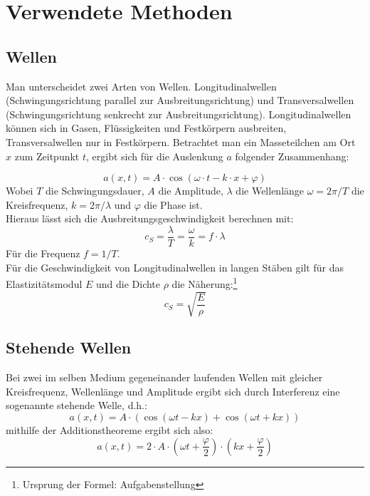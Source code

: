 \section{Verwendete Methoden}
\subsection{Wellen}
Man unterscheidet zwei Arten von Wellen. Longitudinalwellen (Schwingungsrichtung parallel zur Ausbreitungsrichtung) und Transversalwellen (Schwingungsrichtung senkrecht zur Ausbreitungsrichtung). Longitudinalwellen können sich in Gasen, Flüssigkeiten und Festkörpern ausbreiten, Transversalwellen nur in Festkörpern. Betrachtet man ein Masseteilchen am Ort $x$ zum Zeitpunkt $t$, ergibt sich für die Auslenkung $a$ folgender Zusammenhang:

\begin{equation}
a(x, t) = A \cdot \cos (\omega \cdot t - k \cdot x + \varphi)
\label{eq.wave}
\end{equation}
Wobei $T$ die Schwingungsdauer, $A$ die Amplitude, $\lambda$ die Wellenlänge $\omega = 2\pi /T$ die Kreisfrequenz, $k = 2\pi /\lambda$ und $\varphi$ die Phase ist.\\
Hieraus lässt sich die Ausbreitungsgeschwindigkeit berechnen mit:
\begin{equation}
c_S = \frac{\lambda}{T} = \frac{\omega}{k} = f \cdot \lambda
\label{eq:speed}
\end{equation}
Für die Frequenz $f = 1/T$.\\
Für die Geschwindigkeit von Longitudinalwellen in langen Stäben gilt für das Elastizitätsmodul $E$ und die Dichte $\rho$ die Näherung:\footnote{Ursprung der Formel: Aufgabenstellung}
\begin{equation}
c_S = \sqrt{\frac{E}{\rho}}
\label{eq:elast}
\end{equation}
\subsection{Stehende Wellen}
Bei zwei im selben Medium gegeneinander laufenden Wellen mit gleicher Kreisfrequenz, Wellenlänge und Amplitude ergibt sich durch Interferenz eine sogenannte stehende Welle, d.h.:
\begin{equation*}
a(x, t) = A \cdot (\cos (\omega t - kx) + \cos (\omega t + kx))
\end{equation*}
mithilfe der Additionstheoreme ergibt sich also:
\begin{equation}
a(x, t) = 2 \cdot A \cdot \left(\omega t + \frac{\varphi}{2}\right)\cdot\left(kx + \frac{\varphi}{2}\right)
\label{eq:standingWave}
\end{equation}

